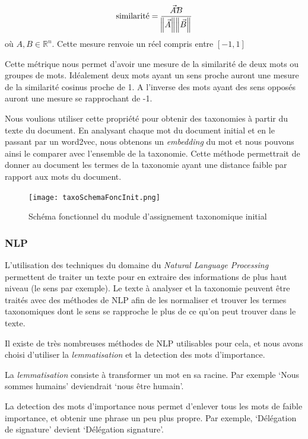 \begin{equation}
	\text{similarité} = \frac{\vec{A} \dot \vec{B}}{\norm{\vec{A}}\norm{\vec{B}}}
	\label{eq:distCosine}
\end{equation}
où $A, B  \in \mathbb{R}^n$.
Cette mesure renvoie un réel compris entre $[-1, 1]$

Cette métrique nous permet d'avoir une mesure de la similarité de deux mots ou groupes de mots.
Idéalement deux mots ayant un sens proche auront une mesure de la similarité cosinus proche de 1.
A l'inverse des mots ayant des sens opposés auront une mesure se rapprochant de -1. 

Nous voulions utiliser cette propriété pour obtenir des taxonomies à partir du texte du document.
En analysant chaque mot du document initial et en le passant par un word2vec, nous obtenons un \textit{embedding} du mot et nous pouvons ainsi le comparer avec l'ensemble de la taxonomie.
Cette méthode permettrait de donner au document les termes de la taxonomie ayant une distance faible par rapport aux mots du document. 

\begin{figure}[h!]
  \centering
  \texttt{[image: taxoSchemaFoncInit.png]}
	\caption[]{Schéma fonctionnel du module d'assignement taxonomique initial}
	\label{fig:taxoInit}
\end{figure}

\subsubsection{NLP}
L'utilisation des techniques du domaine du \textit{Natural Language Processing} permettent de traiter un texte pour en extraire des informations de plus haut niveau (le sens par exemple).
Le texte à analyser et la taxonomie peuvent être traités avec des méthodes de NLP afin de les normaliser et trouver les termes taxonomiques dont le sens se rapproche le plus de ce qu'on peut trouver dans le texte.

Il existe de très nombreuses méthodes de NLP utilisables pour cela, et nous avons choisi d'utiliser la \textit{lemmatisation} et la detection des mots d'importance.

La \textit{lemmatisation} consiste à transformer un mot en sa racine.
Par exemple `Nous sommes humains' deviendrait `nous être humain'.

La detection des mots d'importance nous permet d'enlever tous les mots de faible importance, et obtenir une phrase un peu plus propre.
Par exemple, `Délégation de signature' devient `Délégation signature'.


